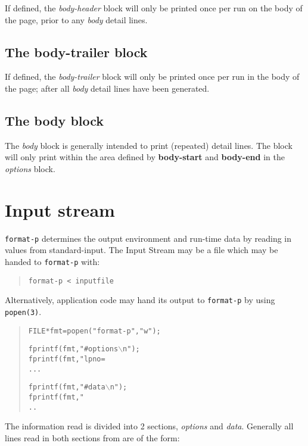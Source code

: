 \documentclass[a4paper,twoside]{article}
\begin{document}
	If defined, the \emph{body-header} block will only be printed once
	per run on the body of the page, prior to any \emph{body} detail
	lines.

\subsection{The body-trailer block}

	If defined, the \emph{body-trailer} block will only be printed once
	per run in the body of the page; after all \emph{body} detail
	lines have been generated.

\subsection{The body block}

	The \emph{body} block is generally intended to print (repeated) detail
	lines. The block will only print within the area defined by
	\textbf{body-start} and \textbf{body-end} in the \emph{options}
	block.

\section{Input stream}

\texttt{format-p} determines the output environment and run-time data by
reading in values from standard-input. The Input Stream may be a
file which may be handed to \texttt{format-p} with:

	\begin{quote}
		\texttt{format-p < inputfile}
	\end{quote}

Alternatively, application code may hand its output to
\texttt{format-p} by using \texttt{popen(3)}.

	\begin{quote}
		\begin{alltt}

		FILE *	fmt = popen ("format-p", "w");

		fprintf (fmt, "#options\(\backslash\)n");
		fprintf (fmt, "lpno=%d\(\backslash\)n", lpno);
		...

		fprintf (fmt, "#data\(\backslash\)n");
		fprintf (fmt, "%s=%s\(\backslash\)n", key, value);
		..
		\end{alltt}
	\end{quote}

The information read is divided
into 2 sections, \emph{options} and \emph{data}. Generally all lines
read in both sections from are of the form:
\end{document}
